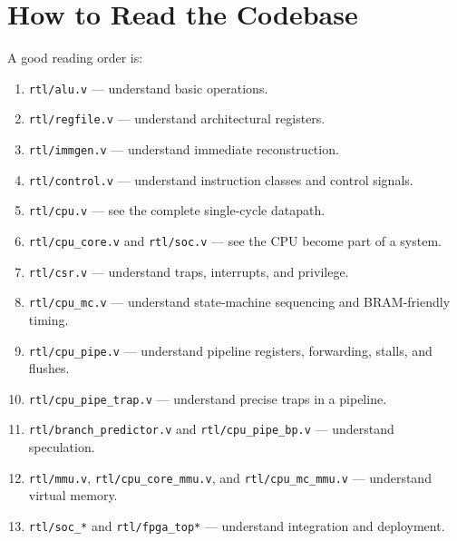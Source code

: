 \section{How to Read the Codebase}

A good reading order is:

\begin{enumerate}
\item \texttt{rtl/alu.v} — understand basic operations.
\item \texttt{rtl/regfile.v} — understand architectural registers.
\item \texttt{rtl/immgen.v} — understand immediate reconstruction.
\item \texttt{rtl/control.v} — understand instruction classes and control signals.
\item \texttt{rtl/cpu.v} — see the complete single-cycle datapath.
\item \texttt{rtl/cpu\_core.v} and \texttt{rtl/soc.v} — see the CPU become part of a system.
\item \texttt{rtl/csr.v} — understand traps, interrupts, and privilege.
\item \texttt{rtl/cpu\_mc.v} — understand state-machine sequencing and BRAM-friendly timing.
\item \texttt{rtl/cpu\_pipe.v} — understand pipeline registers, forwarding, stalls, and flushes.
\item \texttt{rtl/cpu\_pipe\_trap.v} — understand precise traps in a pipeline.
\item \texttt{rtl/branch\_predictor.v} and \texttt{rtl/cpu\_pipe\_bp.v} — understand speculation.
\item \texttt{rtl/mmu.v}, \texttt{rtl/cpu\_core\_mmu.v}, and \texttt{rtl/cpu\_mc\_mmu.v} — understand virtual memory.
\item \texttt{rtl/soc\_*} and \texttt{rtl/fpga\_top*} — understand integration and deployment.
\end{enumerate}

\bigskip

